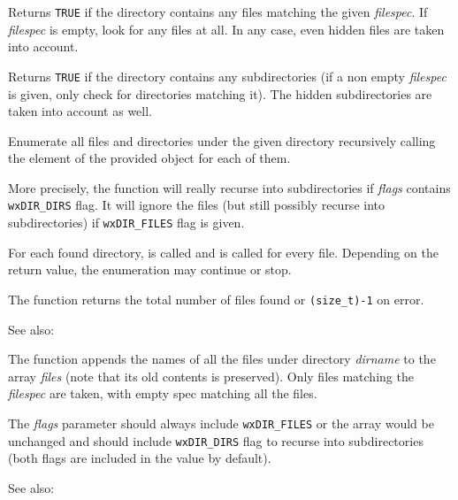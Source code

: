 \label{wxdirhasfiles}


Returns {\tt TRUE} if the directory contains any files matching the given 
{\it filespec}. If {\it filespec} is empty, look for any files at all. In any
case, even hidden files are taken into account.

\label{wxdirhassubdirs}


Returns {\tt TRUE} if the directory contains any subdirectories (if a non
empty {\it filespec} is given, only check for directories matching it).
The hidden subdirectories are taken into account as well.

\label{wxdirtraverse}


Enumerate all files and directories under the given directory recursively
calling the element of the provided  
object for each of them.

More precisely, the function will really recurse into subdirectories if 
{\it flags} contains {\tt wxDIR\_DIRS} flag. It will ignore the files (but
still possibly recurse into subdirectories) if {\tt wxDIR\_FILES} flag is
given.

For each found directory,  is called
and  is called for every file.
Depending on the return value, the enumeration may continue or stop.

The function returns the total number of files found or {\tt (size\_t)-1} on
error.

See also: 

\label{wxdirgetallfiles}


The function appends the names of all the files under directory {\it dirname} 
to the array {\it files} (note that its old contents is preserved). Only files
matching the {\it filespec} are taken, with empty spec matching all the files.

The {\it flags} parameter should always include {\tt wxDIR\_FILES} or the array
would be unchanged and should include {\tt wxDIR\_DIRS} flag to recurse into
subdirectories (both flags are included in the value by default).

See also: 

